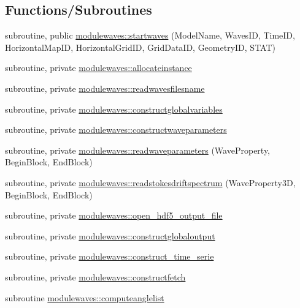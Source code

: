 \subsection*{Functions/\+Subroutines}
\begin{DoxyCompactItemize}
\item 
subroutine, public \mbox{\hyperlink{namespacemodulewaves_afb65a1617589473a3eac08eef0cc3a2b}{modulewaves\+::startwaves}} (Model\+Name, Waves\+ID, Time\+ID, Horizontal\+Map\+ID, Horizontal\+Grid\+ID, Grid\+Data\+ID, Geometry\+ID, S\+T\+AT)
\item 
subroutine, private \mbox{\hyperlink{namespacemodulewaves_a297c227bd5b05df6253e23b3cba4aaca}{modulewaves\+::allocateinstance}}
\item 
subroutine, private \mbox{\hyperlink{namespacemodulewaves_abfbc4de9c60ff461e62bcb11b5e7aad8}{modulewaves\+::readwavesfilesname}}
\item 
subroutine, private \mbox{\hyperlink{namespacemodulewaves_ad44cb14b28b28a735447792076b5f1f5}{modulewaves\+::constructglobalvariables}}
\item 
subroutine, private \mbox{\hyperlink{namespacemodulewaves_a41194554ad5f331ce92bbcc1ac85a374}{modulewaves\+::constructwaveparameters}}
\item 
subroutine, private \mbox{\hyperlink{namespacemodulewaves_a5465d7c0bebb4ccf791eba8d2dfb8a8d}{modulewaves\+::readwaveparameters}} (Wave\+Property, Begin\+Block, End\+Block)
\item 
subroutine, private \mbox{\hyperlink{namespacemodulewaves_a8f1215445f8fd38dbf41e7339b28cf9f}{modulewaves\+::readstokesdriftspectrum}} (Wave\+Property3D, Begin\+Block, End\+Block)
\item 
subroutine, private \mbox{\hyperlink{namespacemodulewaves_ad471c985c50cab76ec8f36df2211dc37}{modulewaves\+::open\+\_\+hdf5\+\_\+output\+\_\+file}}
\item 
subroutine, private \mbox{\hyperlink{namespacemodulewaves_a069825270a300a70ba32518f571bcb90}{modulewaves\+::constructglobaloutput}}
\item 
subroutine, private \mbox{\hyperlink{namespacemodulewaves_a86eae20876164ce3f5e09fbb27e80f64}{modulewaves\+::construct\+\_\+time\+\_\+serie}}
\item 
subroutine, private \mbox{\hyperlink{namespacemodulewaves_ae74bdf3f12b1f411d55edf56bb284dc1}{modulewaves\+::constructfetch}}
\item 
subroutine \mbox{\hyperlink{namespacemodulewaves_a87b9e4a4fb336f9ea383004f7732a8e5}{modulewaves\+::computeanglelist}}

\end{DoxyCompactItemize}
